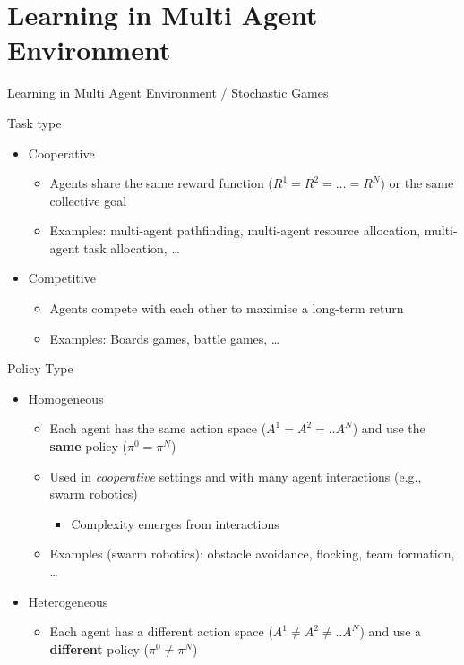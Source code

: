 \documentclass[presentation, 8pt]{beamer}\mode<presentation>{\usetheme{AMSBolognaFC}}
\begin{document}
\section{Learning in Multi Agent Environment}
\begin{frame}[allowframebreaks]{Learning in Multi Agent Environment / Stochastic Games}
\begin{exampleblock}{Task type}
	\begin{itemize}
		\item Cooperative
		\begin{itemize}
			\item Agents share the same reward function ($R^1 = R^2 = \dots = R^N$) or the same collective goal
			\item Examples: multi-agent pathfinding, multi-agent resource allocation, multi-agent task allocation, \dots
		\end{itemize}
		\item Competitive
		\begin{itemize}
			\item Agents compete with each other to maximise a long-term return
			\item Examples: Boards games, battle games, \dots
		\end{itemize}
	\end{itemize}
\end{exampleblock}
\begin{exampleblock}{Policy Type}
\begin{itemize}
	\item Homogeneous
	\begin{itemize}
		\item Each agent has the same action space ($ A^1 = A^2 = .. A ^N$) and use the \textbf{same} policy ($ \pi^0 = \pi^N$)
		\item Used in \emph{cooperative} settings and with many agent interactions (e.g., swarm robotics)
		\begin{itemize}
			\item Complexity emerges from interactions
		\end{itemize}
		\item Examples (swarm robotics): obstacle avoidance, flocking, team formation, \dots
	\end{itemize}
	\item Heterogeneous
	\begin{itemize}
		\item Each agent has a different action space ($ A^1 \neq A^2 \neq .. A ^N$) and use a \textbf{different} policy ($ \pi^0 \neq \pi^N$)

\end{itemize}
\end{itemize}
\end{exampleblock}
\end{frame}
\end{document}
